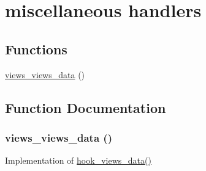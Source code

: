 \hypertarget{group__views__views__module}{
\section{miscellaneous handlers}
\label{group__views__views__module}
}
\subsection*{Functions}
\begin{CompactItemize}
\item 
\hyperlink{group__views__views__module_g7cb75f664d834d02d298626b158c2b75}{views\_\-views\_\-data} ()
\end{CompactItemize}


\subsection{Function Documentation}
\hypertarget{group__views__views__module_g7cb75f664d834d02d298626b158c2b75}{
\subsubsection[{views\_\-views\_\-data}]{\setlength{\rightskip}{0pt plus 5cm}views\_\-views\_\-data ()}}
\label{group__views__views__module_g7cb75f664d834d02d298626b158c2b75}


Implementation of \hyperlink{group__views__hooks_g227057901681e4a33e33c199c7a8c989}{hook\_\-views\_\-data()} 